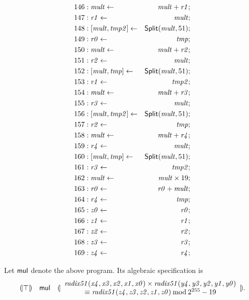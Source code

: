 {\begin{multicols}{2}
\begin{align*}
146 &: \mathit{mult} \leftarrow & \mathit{mult} + \mathit{r1}; \\
147 &: \mathit{r1} \leftarrow & \mathit{mult}; \\
148 &: {[}{\mathit{mult}}, {\mathit{tmp2}}{]} \leftarrow & \mbox{\textsf{Split}}(\mathit{mult}, 51); \\
149 &: \mathit{r0} \leftarrow & \mathit{tmp}; \\
150 &: \mathit{mult} \leftarrow & \mathit{mult} + \mathit{r2}; \\
151 &: \mathit{r2} \leftarrow & \mathit{mult}; \\
152 &: {[}{\mathit{mult}}, {\mathit{tmp}}{]} \leftarrow & \mbox{\textsf{Split}}(\mathit{mult}, 51); \\
153 &: \mathit{r1} \leftarrow & \mathit{tmp2}; \\
154 &: \mathit{mult} \leftarrow & \mathit{mult} + \mathit{r3}; \\
155 &: \mathit{r3} \leftarrow & \mathit{mult}; \\
156 &: {[}{\mathit{mult}}, {\mathit{tmp2}}{]} \leftarrow & \mbox{\textsf{Split}}(\mathit{mult}, 51); \\
157 &: \mathit{r2} \leftarrow & \mathit{tmp}; \\
158 &: \mathit{mult} \leftarrow & \mathit{mult} + \mathit{r4}; \\
159 &: \mathit{r4} \leftarrow & \mathit{mult}; \\
160 &: {[}{\mathit{mult}}, {\mathit{tmp}}{]} \leftarrow & \mbox{\textsf{Split}}(\mathit{mult}, 51); \\
161 &: \mathit{r3} \leftarrow & \mathit{tmp2}; \\
162 &: \mathit{mult} \leftarrow & \mathit{mult} \times 19; \\
163 &: \mathit{r0} \leftarrow & \mathit{r0} + \mathit{mult}; \\
164 &: \mathit{r4} \leftarrow & \mathit{tmp}; \\
165 &: \mathit{z0} \leftarrow & \mathit{r0}; \\
166 &: \mathit{z1} \leftarrow & \mathit{r1}; \\
167 &: \mathit{z2} \leftarrow & \mathit{r2}; \\
168 &: \mathit{z3} \leftarrow & \mathit{r3}; \\
169 &: \mathit{z4} \leftarrow & \mathit{r4}; \\
\end{align*}
\end{multicols}
}

Let $\mbox{\textsf{mul}}$ denote the above program. Its algebraic
specification is 
\[
\begin{array}{rcl}
{(\!|}{\top}{|\!)} &
\mbox{\textsf{mul}} &
{(\!|}{
   \begin{array}{c}
     \mathit{radix51}(\mathit{x4}, \mathit{x3}, \mathit{x2},
     \mathit{x1}, \mathit{x0}) \times
     \mathit{radix51}(\mathit{y4}, \mathit{y3}, \mathit{y2},
     \mathit{y1}, \mathit{y0})\\
     \equiv 
     \mathit{radix51}(\mathit{z4}, \mathit{z3}, \mathit{z2},
     \mathit{z1}, \mathit{z0})
     \mathbin{\textmd{mod}} 2^{255}-19
   \end{array}
}{|\!)}.
\end{array}
\]
